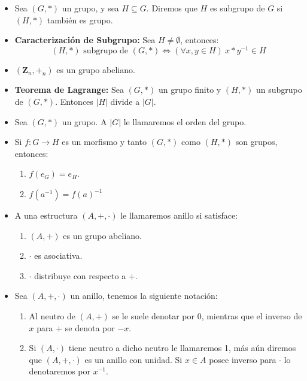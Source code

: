 \documentclass[letterpaper,10pt]{article}
\theoremstyle{plain}
\begin{document}
\begin{framed}
    \begin{multicols}{2}
        \begin{itemize}
            \item Sea $(G,*)$ un grupo, y sea $H\subseteq G$. Diremos que $H$ es subgrupo de $G$ si $(H,*)$ también es grupo.
            \item \textbf{Caracterización de Subgrupo:} Sea $H \neq \emptyset$, entonces:
            $$
            (H,*) \text{ subgrupo de }(G,*)
            \Leftrightarrow
            (\forall x,y \in H)~ x*y^{-1}\in H
            $$
            \item $(\mathbf Z_n,+_n)$ es un grupo abeliano. 
            \item \textbf{Teorema de Lagrange:} Sea $(G,*)$ un grupo finito y $(H,*)$ un subgrupo de $(G,*)$. Entonces $|H|$ divide a $|G|$.
            \item Sea $(G,*)$ un grupo. A $|G|$ le llamaremos el orden del grupo.
            \item Si $f: G \to H$ es un morfismo y tanto $(G,*)$ como $(H,*)$ son grupos, entonces:
                \begin{enumerate}
                	\item $f(e_G)=e_H$.
                	\item $f(a^{-1})=f(a)^{-1}$
                \end{enumerate}
	        \item A una estructura $(A,+,\cdot)$ le llamaremos anillo si satisface:
                \begin{enumerate}
                    \item $(A,+)$ es un grupo abeliano.
                    \item $\cdot$ es asociativa.
                    \item $\cdot$ distribuye con respecto a $+$.
                \end{enumerate}
            \item Sea $(A,+,\cdot)$ un anillo, tenemos la siguiente notación:
                \begin{enumerate}
                    \item Al neutro de $(A,+)$ se le suele denotar por 0, mientras que el inverso de $x$ para $+$ se denota por $-x$.
                    \item Si $(A,\cdot)$ tiene neutro a dicho neutro le llamaremos 1, más aún diremos que $(A,+,\cdot)$ es un anillo con unidad. Si $x \in A$ posee inverso para $\cdot$ lo denotaremos por $x^{-1}$.

\end{enumerate}
\end{itemize}
\end{multicols}
\end{framed}
\end{document}
